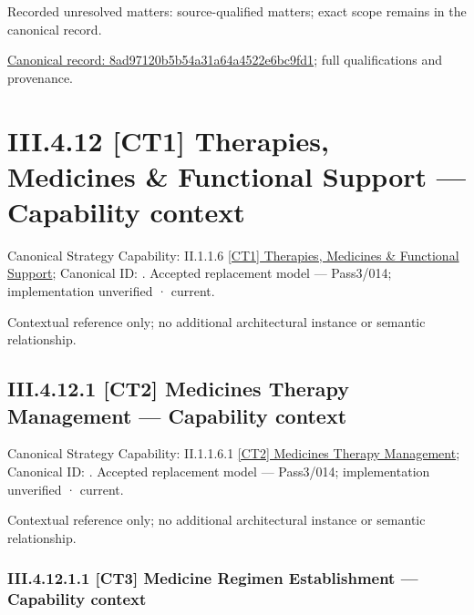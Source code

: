 {\small Recorded unresolved matters: source-qualified matters; exact scope remains in the canonical record.}\par
{\footnotesize \href{../../../../../../../continuum/business/business-process/8ad97120b5b54a31a64a4522e6bc9fd1.md}{Canonical record: 8ad97120b5b54a31a64a4522e6bc9fd1}; full qualifications and provenance.}\par
\section*{III.4.12 [CT1] Therapies, Medicines \& Functional Support — Capability context}
\label{navigation:III.4.12}

{\small Canonical Strategy Capability: II.1.1.6 \hyperref[element:ef1291a271f54508aa65266f88be7e4b]{[CT1] Therapies, Medicines \& Functional Support}; Canonical ID: \texttt{}. Accepted replacement model — Pass3/014; implementation unverified · current.}\par
Contextual reference only; no additional architectural instance or semantic relationship.\par
\subsection*{III.4.12.1 [CT2] Medicines Therapy Management — Capability context}
\label{navigation:III.4.12.1}

{\small Canonical Strategy Capability: II.1.1.6.1 \hyperref[element:4c477c196e0b4afb83aabd274e2df0cb]{[CT2] Medicines Therapy Management}; Canonical ID: \texttt{}. Accepted replacement model — Pass3/014; implementation unverified · current.}\par
Contextual reference only; no additional architectural instance or semantic relationship.\par
\subsubsection*{III.4.12.1.1 [CT3] Medicine Regimen Establishment — Capability context}
\label{navigation:III.4.12.1.1}

